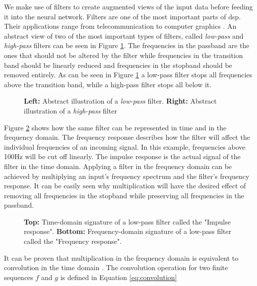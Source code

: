 We make use of filters to create augmented views of the input data before feeding it into the neural network. Filters are one of the most important parts of \gls{dsp}. Their applications range from telecommunication to computer graphics \cite{FILTERSWEB07}. An abstract view of two of the most important types of filters, called \textit{low-pass} and \textit{high-pass} filters can be seen in Figure \ref{fig:lphp}. The frequencies in the passband are the ones that should not be altered by the filter while frequencies in the transition band should be linearly reduced and frequencies in the stopband should be removed entirely. As can be seen in Figure \ref{fig:lphp} a low-pass filter stops all frequencies above the transition band, while a high-pass filter stops all below it.

\begin{figure}[htbp]
    \centering
    
    \caption[]{\textbf{Left:} Abstract illustration of a \textit{low-pass} filter. \textbf{Right:} Abstract illustration of a \textit{high-pass} filter}
    \label{fig:lphp}
\end{figure}


Figure \ref{fig:filter_responses} shows how the same filter can be represented in time and in the frequency domain. The frequency response describes how the filter will affect the individual frequencies of an incoming signal. In this example, frequencies above 100Hz will be cut off linearly. The impulse response is the actual signal of the filter in the time domain. Applying a filter in the frequency domain can be achieved by multiplying an input’s frequency spectrum and the filter’s frequency response. It can be easily seen why multiplication will have the desired effect of removing all frequencies in the stopband while preserving all frequencies in the passband.

\begin{figure}[htbp]
    \centering
    
    \caption[Low-pass filter responses]{\textbf{Top:} Time-domain signature of a low-pass filter called the "Impulse response". \textbf{Bottom:} Frequency-domain signature of a low-pass filter called the "Frequency response".}
    \label{fig:filter_responses}
\end{figure}

It can be proven that multiplication in the frequency domain is equivalent to convolution in the time domain \cite{mcgillem1991continuous}. The convolution operation for two finite sequences $f$ and $g$ is defined in Equation \ref{eq:convolution}

